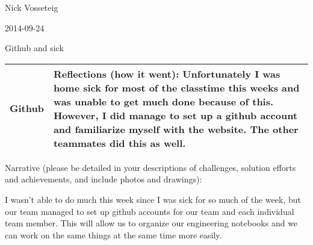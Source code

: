 Nick Vosseteig

2014-09-24

Github and sick

\begin{tabular}{|p{5cm}|p{5cm}|}
 \hline
Github &
Reflections (how it went):
Unfortunately I was home sick for most of the classtime this weeks and was unable to get much done because of this. However, I did manage to set up a github account and familiarize myself with the website. The other teammates did this as well.
 \\
 \hline
\end{tabular}
Narrative (please be detailed in your descriptions of challenges, solution efforts and achievements, and include photos and drawings):

I wasn't able to do much this week since I was sick for so much of the week, but our team managed to set up github accounts for our team and each individual team member. This will allow us to organize our engineering notebooks and we can work on the same things at the same time more easily. 
